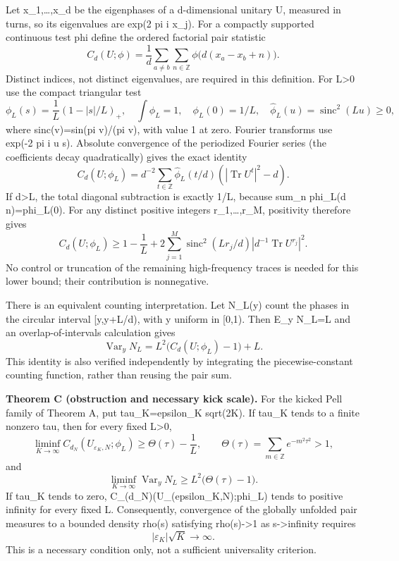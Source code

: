 \documentclass[11pt,a4paper]{article}
\begin{document}
Let x\_1,\ldots,x\_d be the eigenphases of a d-dimensional unitary U, measured in turns, so its eigenvalues are exp(2 pi i x\_j). For a compactly supported continuous test phi define the ordered factorial pair statistic \[
 C_d(U;\phi)=\frac1d\sum_{a\ne b}\sum_{n\in\mathbb Z}
              \phi\bigl(d(x_a-x_b+n)\bigr).                    \tag{23}
\] Distinct indices, not distinct eigenvalues, are required in this definition. For L\textgreater0 use the compact triangular test \[
 \phi_L(s)=\frac1L(1-|s|/L)_+,\quad
 \int\phi_L=1,\quad \phi_L(0)=1/L,\quad
 \widehat\phi_L(u)=\operatorname{sinc}^2(Lu)\geq0,               \tag{24}
\] where sinc(v)=sin(pi v)/(pi v), with value 1 at zero. Fourier transforms use exp(-2 pi i u s). Absolute convergence of the periodized Fourier series (the coefficients decay quadratically) gives the exact identity \[
 C_d(U;\phi_L)=d^{-2}\sum_{t\in\mathbb Z}
   \widehat\phi_L(t/d)(|\operatorname{Tr}U^t|^2-d).              \tag{25}
\] If d\textgreater L, the total diagonal subtraction is exactly 1/L, because sum\_n phi\_L(d n)=phi\_L(0). For any distinct positive integers r\_1,\ldots,r\_M, positivity therefore gives \[
 C_d(U;\phi_L)\geq1-\frac1L+
   2\sum_{j=1}^M\operatorname{sinc}^2(Lr_j/d)
                   |d^{-1}\operatorname{Tr}U^{r_j}|^2.         \tag{26}
\] No control or truncation of the remaining high-frequency traces is needed for this lower bound; their contribution is nonnegative.

There is an equivalent counting interpretation. Let N\_L(y) count the phases in the circular interval {[}y,y+L/d), with y uniform in {[}0,1). Then E\_y N\_L=L and an overlap-of-intervals calculation gives \[
 \operatorname{Var}_y N_L
      =L^2\bigl(C_d(U;\phi_L)-1\bigr)+L.                       \tag{27}
\] This identity is also verified independently by integrating the piecewise-constant counting function, rather than reusing the pair sum.

\textbf{Theorem C (obstruction and necessary kick scale).} For the kicked Pell family of Theorem A, put tau\_K=epsilon\_K sqrt(2K). If tau\_K tends to a finite nonzero tau, then for every fixed L\textgreater0, \[
 \liminf_{K\to\infty} C_{d_N}(U_{\varepsilon_K,N};\phi_L)
      \geq \Theta(\tau)-\frac1L,\qquad
 \Theta(\tau)=\sum_{m\in\mathbb Z}e^{-m^2\tau^2}>1,             \tag{28}
\] and \[
 \liminf_{K\to\infty}\operatorname{Var}_y N_L
      \geq L^2\bigl(\Theta(\tau)-1\bigr).                      \tag{29}
\] If tau\_K tends to zero, C\_(d\_N)(U\_(epsilon\_K,N);phi\_L) tends to positive infinity for every fixed L. Consequently, convergence of the globally unfolded pair measures to a bounded density rho(s) satisfying rho(s)-\textgreater1 as \textbar s\textbar-\textgreater infinity requires \[
             |\varepsilon_K|\sqrt K\longrightarrow\infty.     \tag{30}
\] This is a necessary condition only, not a sufficient universality criterion.
\end{document}
